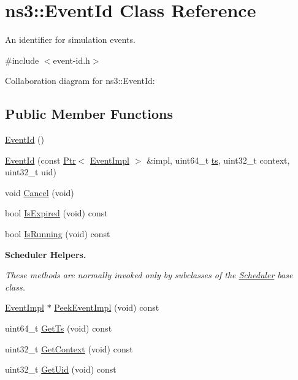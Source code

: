 \hypertarget{classns3_1_1EventId}{}\section{ns3\+:\+:Event\+Id Class Reference}
\label{classns3_1_1EventId}


An identifier for simulation events.  




{\ttfamily \#include $<$event-\/id.\+h$>$}



Collaboration diagram for ns3\+:\+:Event\+Id\+:
\subsection*{Public Member Functions}
\begin{DoxyCompactItemize}
\item 
\hyperlink{classns3_1_1EventId_ae553d827bf2f5dea93b403b2f4ed56ef}{Event\+Id} ()
\item 
\hyperlink{classns3_1_1EventId_a014007cdca4aa0731e173670cea4a1ce}{Event\+Id} (const \hyperlink{classns3_1_1Ptr}{Ptr}$<$ \hyperlink{classns3_1_1EventImpl}{Event\+Impl} $>$ \&impl, uint64\+\_\+t \hyperlink{mmwave_2model_2fading-traces_2fading__trace__generator_8m_ada841f58d7be618bfbc76c87e7d44086}{ts}, uint32\+\_\+t context, uint32\+\_\+t uid)
\item 
void \hyperlink{classns3_1_1EventId_a993ae94e48e014e1afd47edb16db7a11}{Cancel} (void)
\item 
bool \hyperlink{classns3_1_1EventId_a5c30c92e7c1c34b4e8505cc07ed71b02}{Is\+Expired} (void) const 
\item 
bool \hyperlink{classns3_1_1EventId_aabf8476d1a080c199ea0c6aa9ccea372}{Is\+Running} (void) const 
\end{DoxyCompactItemize}
\begin{Indent}{\bf Scheduler Helpers.}\par
{\em These methods are normally invoked only by subclasses of the \hyperlink{classns3_1_1Scheduler}{Scheduler} base class. }\begin{DoxyCompactItemize}
\item 
\hyperlink{classns3_1_1EventImpl}{Event\+Impl} $\ast$ \hyperlink{classns3_1_1EventId_a8d7b6bbf46c8ff5972369aff510c681b}{Peek\+Event\+Impl} (void) const 
\item 
uint64\+\_\+t \hyperlink{classns3_1_1EventId_abddbccdcb927ded5fe6e037c89512948}{Get\+Ts} (void) const 
\item 
uint32\+\_\+t \hyperlink{classns3_1_1EventId_ab0008ff74f99ade9ddada9c6b43e894c}{Get\+Context} (void) const 
\item 
uint32\+\_\+t \hyperlink{classns3_1_1EventId_a1ddf64b15dde2807b3262b300d5264f3}{Get\+Uid} (void) const 
\end{DoxyCompactItemize}
\end{Indent}
